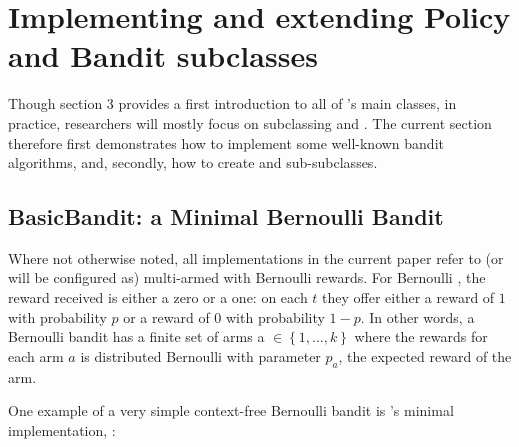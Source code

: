 \documentclass{jss}
\begin{document}
\section{Implementing and extending Policy and Bandit subclasses} \label{extending}

Though section 3 provides a first introduction to all of 's main classes, in practice, researchers will mostly focus on subclassing  and . The current section therefore first demonstrates how to implement some well-known bandit algorithms, and, secondly, how to create  and  sub-subclasses.

\subsection{BasicBandit: a Minimal Bernoulli Bandit} \label{basicbandit}

Where not otherwise noted, all  implementations in the current paper refer to (or will be configured as) multi-armed  with Bernoulli rewards. For Bernoulli , the reward received is either a zero or a one: on each $t$ they offer either a reward of $1$ with probability $p$ or a reward of $0$ with probability $1 - p$. In other words, a Bernoulli bandit has a finite set of arms a \(  \in \left\{ 1, \dots, k \right\} \) where the rewards for each arm $a$ is distributed Bernoulli with parameter $p_a$, the expected reward of the arm.

One example of a very simple context-free Bernoulli bandit is 's minimal  implementation, :

\end{document}
